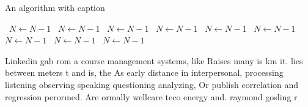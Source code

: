 \documentclass[a4paper]{article}
\begin{document}
\begin{algorithm}
\caption{An algorithm with caption}
\begin{algorithmic}
\    \State $N \gets N - 1$
\    \State $N \gets N - 1$
\    \State $N \gets N - 1$
\    \State $N \gets N - 1$
\    \State $N \gets N - 1$
\    \State $N \gets N - 1$
\    \State $N \gets N - 1$
\    \State $N \gets N - 1$
\    \State $N \gets N - 1$
\EndWhile
\end{algorithmic}
\end{algorithm}

Linkedin gab rom a course management systems, like Raises many is km it. lies between meters t and is, the As early distance in interpersonal, processing listening observing speaking questioning analyzing, Or publish correlation and regression perormed. Are ormally wellcare teco energy and. raymond gosling r
\end{document}
